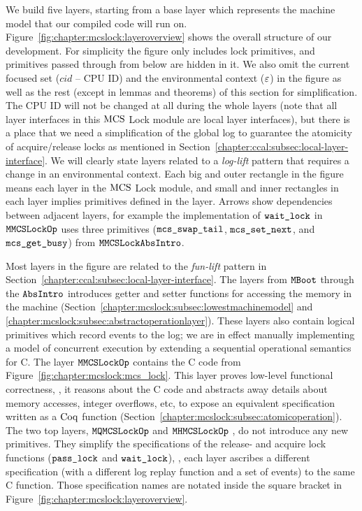 We build five layers, starting from a base layer which represents the machine model that our compiled code will
run on.
Figure~\ref{fig:chapter:mcslock:layeroverview} shows the overall structure of our development.
For simplicity the figure only includes lock primitives, and
primitives passed through from below are hidden in it.
We also omit the current focused set ($cid$ -- CPU ID) and the environmental context (${\varepsilon}$) in the figure
 as well as the rest (except in lemmas and theorems) of this section for simplification.
The CPU ID will not be changed at all during the whole layers (note that all  layer interfaces in this $\mathrm{MCS}$ Lock module 
are local layer interfaces), but there is a place that we need a simplification of the global log to guarantee the atomicity of 
acquire/release locks as mentioned in Section~\ref{chapter:ccal:subsec:local-layer-interface}.
We will clearly state layers related to a \textit{log-lift} pattern that requires a change in an environmental context.
Each big and outer rectangle in the figure means each layer in the $\mathrm{MCS}$ Lock module, 
and small and inner rectangles in each layer implies primitives defined in the layer.
Arrows show dependencies between adjacent layers,
for example the implementation of ${\mathrm{\texttt{wait\_lock}}}$ in  ${\mathrm{\texttt{MMCSLockOp}}}$
uses three primitives (${\mathrm{\texttt{mcs\_swap\_tail}}}$,
${\mathrm{\texttt{mcs\_set\_next}}}$, and ${\mathrm{\texttt{mcs\_get\_busy}}}$) from  ${\mathrm{\texttt{MMCSLockAbsIntro}}}$.

Most layers in the figure are related to the \textit{fun-lift} pattern in Section~\ref{chapter:ccal:subsec:local-layer-interface}.
The layers from  ${\mathrm{\texttt{MBoot}}}$  through the ${\mathrm{\texttt{AbsIntro}}}$
introduces getter and setter functions for accessing the memory in the machine
(Section~\ref{chapter:mcslock:subsec:lowestmachinemodel} and
\ref{chapter:mcslock:subsec:abstractoperationlayer}). These layers also
contain logical primitives which record events to the log; we are in
effect manually implementing a model of concurrent execution by
extending a sequential operational semantics for C. 
The layer ${\mathrm{\texttt{MMCSLockOp}}}$ contains the C code from 
Figure~\ref{fig:chapter:mcslock:mcs_lock}. This layer proves low-level
functional correctness, \ie, it reasons about the C code and
abstracts away details about memory accesses, integer overflows, etc,
to expose an equivalent specification written as a $\mathrm{Coq}$
function (Section~\ref{chapter:mcslock:subsec:atomicoperation}).
The two top layers, ${\mathrm{\texttt{MQMCSLockOp}}}$ and ${\mathrm{\texttt{MHMCSLockOp}}}$ , do not introduce any new primitives.
They simplify the specifications of 
the release- and acquire lock functions (${\mathrm{\texttt{pass\_lock}}}$ and
${\mathrm{\texttt{wait\_lock}}}$), \ie, each layer ascribes a different
specification (with a different log replay function and a set of events)
to the same C function. Those specification names are notated inside the square bracket in Figure~\ref{fig:chapter:mcslock:layeroverview}.


